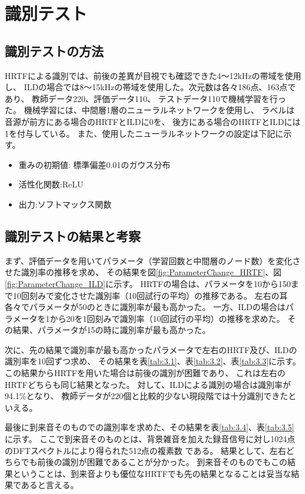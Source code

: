 \documentclass[autodetect-engine,12pt,titlepagedvi=dvipdfmx,ja=standard]{bxjsreport}
\begin{document}
\chapter{識別テスト}\label{chap3}

\section{識別テストの方法}\label{chap3:method}
HRTFによる識別では、前後の差異が目視でも確認できた4〜12kHzの帯域を使用し、
ILDの場合では8〜15kHzの帯域を使用した。次元数は各々186点、163点であり、
教師データ220、評価データ110、
テストデータ110で機械学習を行った。
機械学習には、中間層1層のニューラルネットワークを使用し、
ラベルは音源が前方にある場合のHRTFとILDに0を、
後方にある場合のHRTFとILDには1を付与している。
また、使用したニューラルネットワークの設定は下記に示す。

\begin{itemize}
   \item 重みの初期値: 標準偏差0.01のガウス分布
   \item 活性化関数:ReLU
   \item 出力:ソフトマックス関数
\end{itemize}


\section{識別テストの結果と考察}\label{chap3:snd}
まず、評価データを用いてパラメータ（学習回数と中間層のノード数）を変化させた識別率の推移を求め、
その結果を図\ref{fig:ParameterChange_HRTF}、図\ref{fig:ParameterChange_ILD}に示す。
HRTFの場合は、パラメータを10から150まで10回刻みで変化させた識別率（10回試行の平均）の推移である。
左右の耳各々でパラメータが50のときに識別率が最も高かった。
一方、ILDの場合はパラメータを1から20を1回刻みで識別率（10回試行の平均）の推移を求めた。
その結果、パラメータが15の時に識別率が最も高かった。

次に、先の結果で識別率が最も高かったパラメータで左右のHRTF及び、ILDの識別率を10回ずつ求め、
その結果を表\ref{tab:3.1}、表\ref{tab:3.2}、表\ref{tab:3.3}に示す。
この結果からHRTFを用いた場合は前後の識別が困難であり、
これは左右のHRTFどちらも同じ結果となった。
対して、ILDによる識別の場合は識別率が94.1\%となり、
教師データが220個と比較的少ない現段階では十分識別できたといえる。

最後に到来音そのものでの識別率を求めた、その結果を表\ref{tab:3.4}、表\ref{tab:3.5}に示す。
ここで到来音そのものとは、背景雑音を加えた録音信号に対し1024点のDFTスペクトルにより得られた512点の複素数
である。
結果として、左右どちらでも前後の識別が困難であることが分かった。
到来音そのものでもこの結果ということは、到来音よりも優位なHRTFでも先の結果となることは妥当な結果であると言える。
\end{document}
